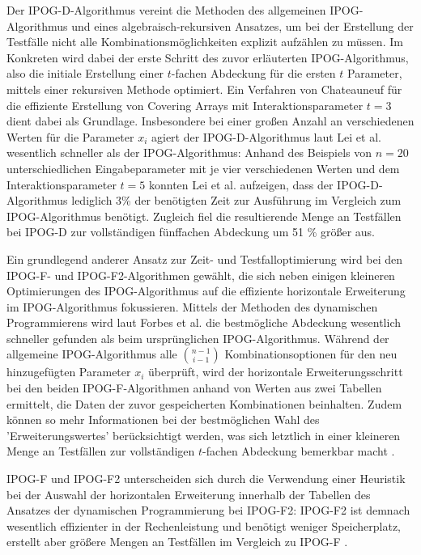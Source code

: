 Der IPOG-D-Algorithmus \cite{lei2008ipog} vereint die Methoden des allgemeinen IPOG-Algorithmus und eines algebraisch-rekursiven Ansatzes, um bei der Erstellung der Testfälle nicht alle Kombinationsmöglichkeiten explizit aufzählen zu müssen. Im Konkreten wird dabei der erste Schritt des zuvor erläuterten IPOG-Algorithmus, also die initiale Erstellung einer $t$-fachen Abdeckung für die ersten $t$ Parameter, mittels einer rekursiven Methode optimiert. Ein Verfahren von Chateauneuf \cite{chateauneuf1999covering} für die effiziente Erstellung von Covering Arrays mit Interaktionsparameter $t = 3$ dient dabei als Grundlage. Insbesondere bei einer großen Anzahl an verschiedenen Werten für die Parameter $x_i$ agiert der IPOG-D-Algorithmus laut Lei et al. \cite{lei2008ipog} wesentlich schneller als der IPOG-Algorithmus: Anhand des Beispiels von $n=20$ unterschiedlichen Eingabeparameter mit je vier verschiedenen Werten und dem Interaktionsparameter $t=5$ konnten Lei et al. aufzeigen, dass der IPOG-D-Algorithmus lediglich 3\% der benötigten Zeit zur Ausführung im Vergleich zum IPOG-Algorithmus benötigt. Zugleich fiel die resultierende Menge an Testfällen bei IPOG-D zur vollständigen fünffachen Abdeckung um 51 \% größer aus.

Ein grundlegend anderer Ansatz zur Zeit- und Testfalloptimierung wird bei den IPOG-F- und IPOG-F2-Algorithmen \cite{forbes2008refining} gewählt, die sich neben einigen kleineren Optimierungen des IPOG-Algorithmus auf die effiziente horizontale Erweiterung im IPOG-Algorithmus fokussieren. Mittels der Methoden des dynamischen Programmierens wird laut Forbes et al. \cite{forbes2008refining} die bestmögliche Abdeckung wesentlich schneller gefunden als beim ursprünglichen IPOG-Algorithmus. Während der allgemeine IPOG-Algorithmus alle $\binom{n-1}{i-1}$ Kombinationsoptionen für den neu hinzugefügten Parameter $x_i$ überprüft, wird der horizontale Erweiterungsschritt bei den beiden IPOG-F-Algorithmen anhand von Werten aus zwei Tabellen ermittelt, die Daten der zuvor gespeicherten Kombinationen beinhalten. Zudem können so mehr Informationen bei der bestmöglichen Wahl des 'Erweiterungswertes' berücksichtigt werden, was sich letztlich in einer kleineren Menge an Testfällen zur vollständigen $t$-fachen Abdeckung bemerkbar macht \cite{forbes2008refining}.

IPOG-F und IPOG-F2 unterscheiden sich durch die Verwendung einer Heuristik bei der Auswahl der horizontalen Erweiterung innerhalb der Tabellen des Ansatzes der dynamischen Programmierung bei IPOG-F2: IPOG-F2 ist demnach wesentlich effizienter in der Rechenleistung und benötigt weniger Speicherplatz, erstellt aber größere Mengen an Testfällen im Vergleich zu IPOG-F \cite{forbes2008refining}. 

